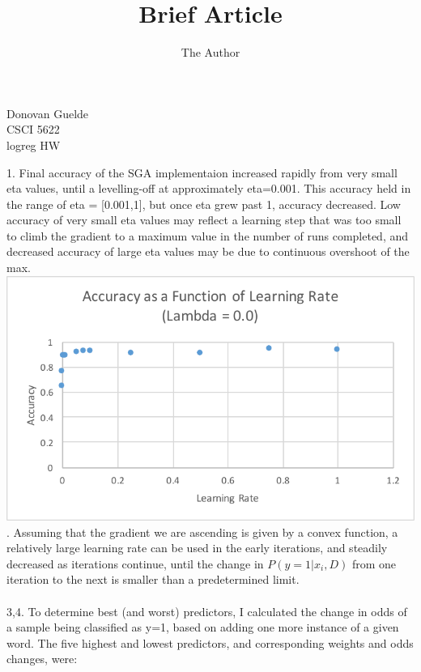 \documentclass[11pt, oneside]{article}   	%
\title{Brief Article}
\author{The Author}
\begin{document}
\begin{flushright}
Donovan Guelde\\
CSCI 5622\\
logreg HW\\
\end{flushright}

1.  Final accuracy of the SGA implementaion increased rapidly from very small eta values, until a levelling-off at approximately eta=0.001.  This accuracy held in the range of eta = [0.001,1], but once eta grew past 1, accuracy decreased.  Low accuracy of very small eta values may reflect a learning step that was too small to climb the gradient to a maximum value in the number of runs completed, and decreased accuracy of large eta values may be due to continuous overshoot of the max.\\
\center
\includegraphics[totalheight=1.5in]{Picture1}
.  Assuming that the gradient we are ascending is given by a convex function, a relatively large learning rate can be used in the early iterations, and steadily decreased as iterations continue, until the change in $P(y=1|x_i,D)$  from one iteration to the next is smaller than a predetermined limit.\\
\\
3,4.  To determine best (and worst) predictors, I calculated the change in odds of a sample being classified as y=1, based on adding one more instance of a given word.  The five highest and lowest predictors, and corresponding weights and odds changes, were:\\\\
\end{document}
